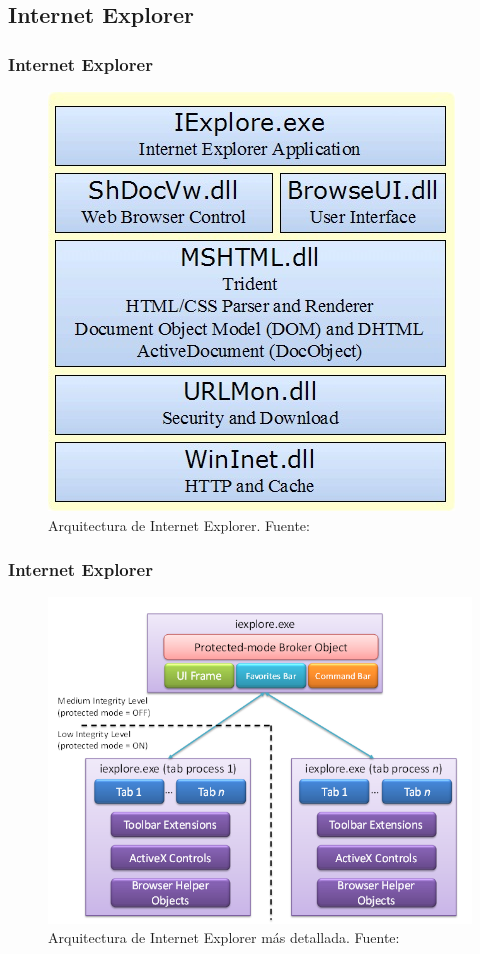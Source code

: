 \documentclass[serif,9pt]{beamer}
\begin{document}
\subsection{Internet Explorer}
\begin{frame}
	\frametitle{Internet Explorer}
	\begin{figure}[h]
	    \centering
		\includegraphics[scale=0.5]{figures/IEArch.jpg}
		\caption{Arquitectura de Internet Explorer. Fuente: \cite{IEArchImg}}
		\label{fig:archIE}
    \end{figure}
\end{frame}

\begin{frame}
	\frametitle{Internet Explorer}
	\begin{figure}[h]
        \centering
        \includegraphics[scale=0.35]{figures/11_IE8andLooselyCoupledIELCIE_2.png}
        \caption{Arquitectura de Internet Explorer m\'as detallada. Fuente: \cite{IE8LCIE}}
        \label{fig:archIE2}
    \end{figure}
\end{frame}
\end{document}
